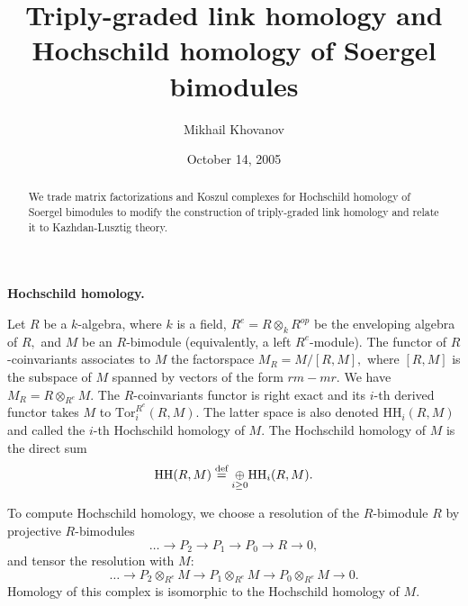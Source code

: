 \documentclass[12pt]{article}
\title{Triply-graded link homology and Hochschild homology of Soergel bimodules}
\author{ Mikhail Khovanov}
\date{October 14, 2005}
\newcommand{\oplusop}[1]{{\mathop{\oplus}\limits_{#1}}}
\begin{document}
 

\maketitle
\baselineskip 14pt
 
\def\R{\mathbb R}
\def\Q{\mathbb Q}
\def\Z{\mathbb Z}
\def\N{\mathbb N} 
\def\C{\mathbb C}
\def\l{\lbrace}
\def\r{\rbrace}
\def\o{\otimes}
\def\lra{\longrightarrow}
\def\Hom{\mathrm{Hom}}
\def\RHom{\mathrm{RHom}}
\def\Id{\mathrm{Id}}
\newcommand{\define}{\stackrel{\mbox{\scriptsize{def}}}{=}}
\def\drawing#1{\begin{center}\epsfig{file=#1}\end{center}}
 \def\yesnocases#1#2#3#4{\left\{
\begin{array}{ll} #1 & #2 \\ #3 & #4
\end{array} \right. }

\begin{abstract} We trade matrix factorizations and Koszul 
complexes for Hochschild homology of Soergel bimodules to 
modify the construction of triply-graded link homology and 
relate it to Kazhdan-Lusztig theory. 
\end{abstract}

\vspace{0.2in} 

{\bf Hochschild homology.} 

\noindent 
Let $R$ be a $k$-algebra, where $k$ is a field,
$R^e=R\otimes_k R^{op}$ be the enveloping algebra of $R,$ and 
$M$ be an $R$-bimodule (equivalently, a left $R^e$-module). 
The functor of $R$-coinvariants 
associates to $M$ the factorspace $M_R=M/[R,M],$ where 
$[R,M]$ is the subspace of $M$ spanned by vectors of the form 
$rm-mr.$ We have $M_R= R\otimes_{R^e} M.$ The $R$-coinvariants 
functor is right exact and its $i$-th derived functor takes $M$ to   
$\mathrm{Tor}_i^{R^e}(R,M).$  The latter space is also denoted 
$\mathrm{HH}_i(R,M)$ and called the $i$-th Hochschild homology of $M.$ 
The Hochschild homology of $M$ is the direct sum 
$$\mathrm{HH}(R,M) \define \oplusop{i\ge 0} \mathrm{HH}_i(R,M).$$ 

\vspace{0.1in} 

To compute Hochschild homology, we choose a resolution of 
the $R$-bimodule $R$ by projective $R$-bimodules
$$  \dots \lra P_2 \lra P_1 \lra P_0 \lra R \lra 0, $$ 
and tensor the resolution with $M:$ 
$$  \dots \lra P_2\otimes_{R^e} M \lra P_1\otimes_{R^e} M 
 \lra P_0\otimes_{R^e} M \lra 0.$$ 
Homology of this complex is isomorphic to the Hochschild homology 
of $M.$ 
\end{document}
